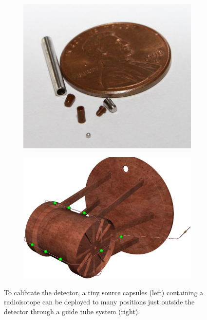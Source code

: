 \documentclass[herrin-thesis.tex]{subfiles}
\begin{document}
\begin{figure}[htb]
\centering
\begin{subfigure}[c]{0.33\linewidth}
\includegraphics[width=\textwidth]{./photos/source_capsule.png}
\end{subfigure}\hspace{0.05\linewidth}\hfill%
\begin{subfigure}[c]{0.60\linewidth}
\includegraphics[width=\textwidth]{./photos/calibration_tubing_cropped.png}
\end{subfigure}
\caption[The calibration system]{To calibrate the detector, a tiny source capsules (left) containing a radioisotope can be deployed to many positions just outside the detector through a guide tube system (right).}
\label{fig:detector_calibration}
\end{figure}
\end{document}
